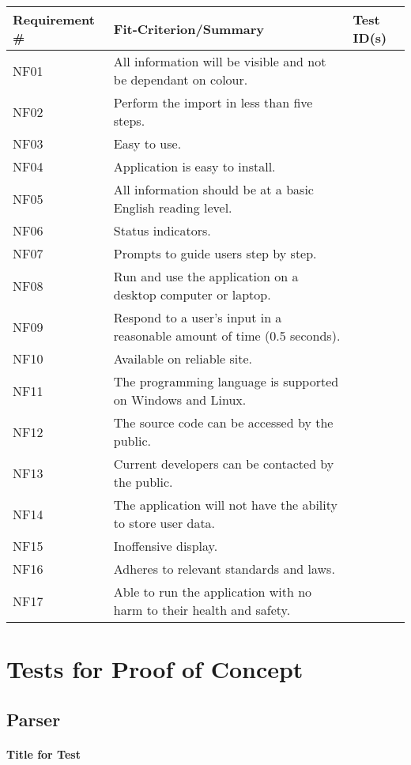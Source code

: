 \documentclass[12pt, titlepage]{article}
\begin{document}
\begin{tabular}{ |p{3cm}|p{8cm}|p{2cm}| }
\hline Requirement #  & Fit-Criterion/Summary & Test ID(s) \\
\toprule
NF01 & All information will be visible and not be dependant on colour.  & \\
NF02 & Perform the import in less than ﬁve steps. & \\
NF03 & Easy to use. & \\
NF04 & Application is easy to install. & \\
NF05 & All information should be at a basic English reading level.  & \\
NF06 & Status indicators. & \\
NF07 & Prompts to guide users step by step. & \\
NF08 & Run and use the application on a desktop computer or laptop.  & \\
NF09 & Respond to a user’s input in a reasonable amount of time (0.5 seconds). & \\
NF10 & Available on reliable site. & \\
NF11 & The programming language is supported on Windows and Linux.  & \\
NF12 & The source code can be accessed by the public.  & \\
NF13 & Current developers can be contacted by the public.  & \\
NF14 & The application will not have the ability to store user data. & \\
NF15 & Inoffensive display. & \\
NF16 & Adheres to relevant standards and laws. & \\
NF17 & Able to run the application with no harm to their health and safety.  & \\

\bottomrule
\end{tabular}

\section{Tests for Proof of Concept}

\subsection{Parser}
		
\paragraph{Title for Test}
\end{document}
